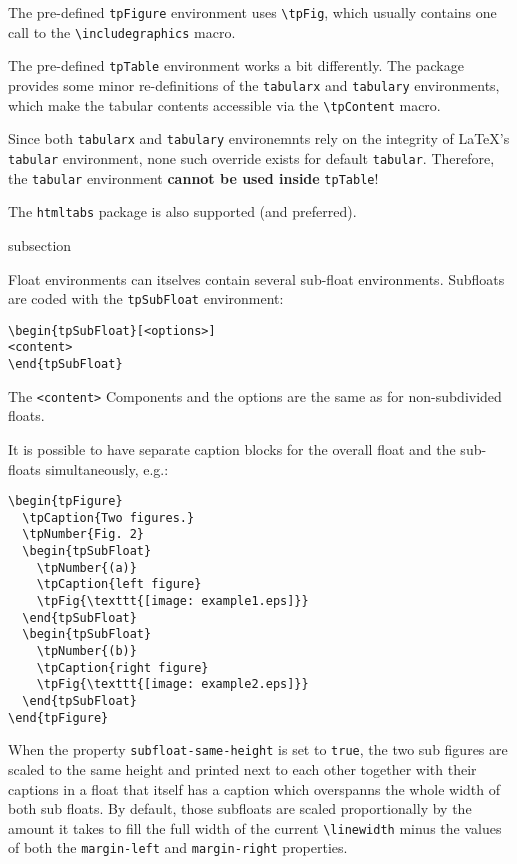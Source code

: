 The pre-defined \lstinline{tpFigure} environment uses
\lstinline{\tpFig},
which usually contains one call to the \lstinline{\includegraphics}
macro.

The pre-defined \lstinline{tpTable} environment works a bit
differently. The package provides some minor re-definitions of the
\lstinline{tabularx} and \lstinline{tabulary} environments, which make
the tabular contents accessible via the \lstinline{\tpContent} macro.

Since both \lstinline{tabularx} and \lstinline{tabulary} environemnts
rely on the integrity of \LaTeX's \lstinline{tabular} environment,
none such override exists for default \lstinline{tabular}. Therefore,
the \lstinline{tabular} environment \textbf{cannot be used inside}
\lstinline{tpTable}!

The \lstinline{htmltabs} package is also supported (and preferred).


\begin{heading}[label=sec:flt:subfloat]{subsection}
\end{heading}

Float environments can itselves contain several sub-float
environments. Subfloats are coded with the \lstinline{tpSubFloat}
environment:
\begin{lstlisting}[style=tex]
\begin{tpSubFloat}[<options>]
<content>
\end{tpSubFloat}
\end{lstlisting}
The \lstinline{<content>} Components and the options are the same as
for non-subdivided floats.

It is possible to have separate caption blocks for the overall float
and the sub-floats simultaneously, e.g.:
\begin{lstlisting}[style=tex]
\begin{tpFigure}
  \tpCaption{Two figures.}
  \tpNumber{Fig. 2}
  \begin{tpSubFloat}
    \tpNumber{(a)}
    \tpCaption{left figure}
    \tpFig{\texttt{[image: example1.eps]}}
  \end{tpSubFloat}
  \begin{tpSubFloat}
    \tpNumber{(b)}
    \tpCaption{right figure}
    \tpFig{\texttt{[image: example2.eps]}}
  \end{tpSubFloat}
\end{tpFigure}
\end{lstlisting}
When the property \lstinline{subfloat-same-height} is set to
\lstinline{true}, the two sub figures are scaled to the same height
and printed next to each other together with their captions in a float
that itself has a caption which overspanns the whole width of both sub
floats. By default, those subfloats are scaled proportionally by the
amount it takes to fill the full width of the current
\lstinline{\linewidth} minus the values of both the
\lstinline{margin-left} and \lstinline{margin-right} properties.

